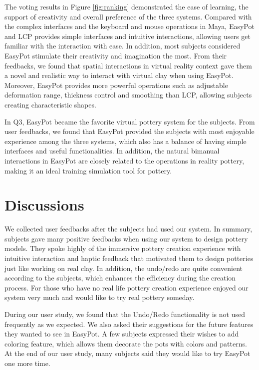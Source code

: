\documentclass{svjour3}                     %
\begin{document}
The voting results in Figure \ref{fig:ranking} demonstrated the ease of learning, the support of creativity and overall preference of the three systems.
Compared with the complex interfaces and the keyboard and mouse operations in Maya, EasyPot and LCP provides simple interfaces and intuitive interactions, allowing users get familiar with the interaction with ease.
In addition, most subjects considered EasyPot stimulate their creativity and imagination the most. From their feedbacks, we found that spatial interactions in virtual reality context gave them a novel and realistic way to interact with virtual clay when using EasyPot. Moreover, EasyPot provides more powerful operations such as adjustable deformation range, thickness control and smoothing than LCP, allowing subjects creating characteristic shapes.

In Q3, EasyPot became the favorite virtual pottery system for the subjects. From user feedbacks, we found that EasyPot provided the subjects with most enjoyable experience among the three systems, which also has a balance of having simple interfaces and useful functionalities. In addition, the natural bimanual interactions in EasyPot are closely related to the operations in reality pottery, making it an ideal training simulation tool for pottery.

\section{Discussions}
\label{sec:7}
We collected user feedbacks after the subjects had used our system. In summary, subjects gave many positive feedbacks when using our system to design pottery models. They spoke highly of the immersive pottery creation experience with intuitive interaction and haptic feedback that motivated them to design potteries just like working on real clay. In addition, the undo/redo are quite convenient according to the subjects, which enhances the efficiency during the creation process. For those who have no real life pottery creation experience enjoyed our system very much and would like to try real pottery someday. 

During our user study, we found that the Undo/Redo functionality is not used frequently as we expected. 
We also asked their suggestions for the future features they wanted to see in EasyPot.
A few subjects expressed their wishes to add coloring feature, which allows them decorate the pots with colors and patterns.
At the end of our user study, many subjects said they would like to try EasyPot one more time.
\end{document}
